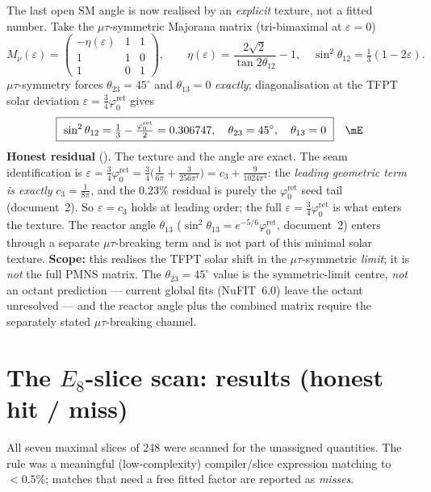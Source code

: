 \documentclass[11pt,a4paper]{article}
\newcommand{\cthree}{c_3}
\newcommand{\phiz}{\varphi_0^{\mathrm{ret}}}
\theoremstyle{definition}
\begin{document}
\begin{winbox}
The last open SM angle is now realised by an \emph{explicit} texture, not a fitted number. Take the
$\mu\tau$-symmetric Majorana matrix (tri-bimaximal at $\varepsilon{=}0$)
\begin{equation}
  M_\nu(\varepsilon)=\begin{pmatrix}-\eta(\varepsilon)&1&1\\ 1&1&0\\ 1&0&1\end{pmatrix},\qquad
  \eta(\varepsilon)=\frac{2\sqrt2}{\tan2\theta_{12}}-1,\quad
  \sin^2\theta_{12}=\tfrac13(1-2\varepsilon).
\end{equation}
$\mu\tau$-symmetry forces $\theta_{23}=45^\circ$ and $\theta_{13}=0$ \emph{exactly}; diagonalisation at the
TFPT solar deviation $\varepsilon=\tfrac34\phiz$ gives
\begin{equation}
  \boxed{\ \sin^2\theta_{12}=\tfrac13-\tfrac{\phiz}{2}=0.306747,\quad
  \theta_{23}=45^\circ,\quad \theta_{13}=0\ }\quad\mE
\end{equation}
\textbf{Honest residual} (). The texture and the angle are exact. The seam identification is
$\varepsilon=\tfrac34\phiz=\tfrac34\bigl(\tfrac1{6\pi}+\tfrac3{256\pi^4}\bigr)=\cthree+\tfrac{9}{1024\pi^4}$:
the \emph{leading geometric term is exactly} $\cthree=\tfrac1{8\pi}$, and the $0.23\%$ residual is purely the
$\phiz$ seed tail (document~2). So $\varepsilon=\cthree$ holds at leading order; the full
$\varepsilon=\tfrac34\phiz$ is what enters the texture. The reactor angle $\theta_{13}$
($\sin^2\theta_{13}=e^{-5/6}\phiz$, document~2) enters through a separate $\mu\tau$-breaking term and is not
part of this minimal solar texture. \textbf{Scope:} this realises the TFPT solar shift in the
$\mu\tau$-symmetric \emph{limit}; it is \emph{not} the full PMNS matrix. The $\theta_{23}{=}45^\circ$ value
is the symmetric-limit centre, \emph{not} an octant prediction --- current global fits (NuFIT~6.0) leave
the octant unresolved --- and the reactor angle plus the combined matrix require the separately stated
$\mu\tau$-breaking channel.
\end{winbox}

\section{The $E_8$-slice scan: results (honest hit / miss)}
All seven maximal slices of $248$ were scanned for the unassigned quantities. The rule was a meaningful
(low-complexity) compiler/slice expression matching to $<0.5\%$; matches that need a free fitted factor
are reported as \emph{misses}.
\end{document}
